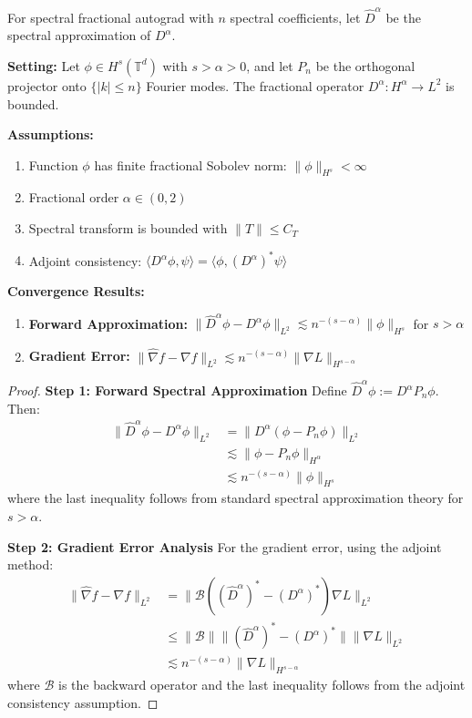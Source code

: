 \begin{theorem}
For spectral fractional autograd with $n$ spectral coefficients, let $\hat{D}^{\alpha}$ be the spectral approximation of $D^{\alpha}$.

\textbf{Setting:} Let $\phi \in H^s(\mathbb{T}^d)$ with $s > \alpha > 0$, and let $P_n$ be the orthogonal projector onto $\{|k| \leq n\}$ Fourier modes. The fractional operator $D^{\alpha}: H^{\alpha} \to L^2$ is bounded.

\textbf{Assumptions:}
\begin{enumerate}
\item Function $\phi$ has finite fractional Sobolev norm: $\|\phi\|_{H^s} < \infty$
\item Fractional order $\alpha \in (0,2)$
\item Spectral transform is bounded with $\|T\| \leq C_T$
\item Adjoint consistency: $\langle D^{\alpha} \phi, \psi \rangle = \langle \phi, (D^{\alpha})^* \psi \rangle$
\end{enumerate}

\textbf{Convergence Results:}
\begin{enumerate}
\item \textbf{Forward Approximation:} $\|\hat{D}^{\alpha} \phi - D^{\alpha} \phi\|_{L^2} \lesssim n^{-(s-\alpha)} \|\phi\|_{H^s}$ for $s > \alpha$
\item \textbf{Gradient Error:} $\|\hat{\nabla}f - \nabla f\|_{L^2} \lesssim n^{-(s-\alpha)} \|\nabla L\|_{H^{s-\alpha}}$
\end{enumerate}
\end{theorem}

\begin{proof}
\textbf{Step 1: Forward Spectral Approximation}
Define $\hat{D}^{\alpha} \phi := D^{\alpha} P_n \phi$. Then:
\begin{align}
\|\hat{D}^{\alpha} \phi - D^{\alpha} \phi\|_{L^2} &= \|D^{\alpha}(\phi - P_n \phi)\|_{L^2} \\
&\lesssim \|\phi - P_n \phi\|_{H^{\alpha}} \\
&\lesssim n^{-(s-\alpha)} \|\phi\|_{H^s}
\end{align}
where the last inequality follows from standard spectral approximation theory for $s > \alpha$.

\textbf{Step 2: Gradient Error Analysis}
For the gradient error, using the adjoint method:
\begin{align}
\|\hat{\nabla}f - \nabla f\|_{L^2} &= \|\mathcal{B}((\hat{D}^{\alpha})^* - (D^{\alpha})^*) \nabla L\|_{L^2} \\
&\leq \|\mathcal{B}\| \|(\hat{D}^{\alpha})^* - (D^{\alpha})^*\| \|\nabla L\|_{L^2} \\
&\lesssim n^{-(s-\alpha)} \|\nabla L\|_{H^{s-\alpha}}
\end{align}
where $\mathcal{B}$ is the backward operator and the last inequality follows from the adjoint consistency assumption.
\end{proof}

